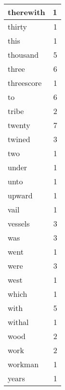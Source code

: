 \begin{center}
\begin{longtable}{l|r}
therewith & 1 \\ \hline
thirty & 1 \\ \hline
this & 1 \\ \hline
thousand & 5 \\ \hline
three & 6 \\ \hline
threescore & 1 \\ \hline
to & 6 \\ \hline
tribe & 2 \\ \hline
twenty & 7 \\ \hline
twined & 3 \\ \hline
two & 1 \\ \hline
under & 1 \\ \hline
unto & 1 \\ \hline
upward & 1 \\ \hline
vail & 1 \\ \hline
vessels & 3 \\ \hline
was & 3 \\ \hline
went & 1 \\ \hline
were & 3 \\ \hline
west & 1 \\ \hline
which & 1 \\ \hline
with & 5 \\ \hline
withal & 1 \\ \hline
wood & 2 \\ \hline
work & 2 \\ \hline
workman & 1 \\ \hline
years & 1 \\ \hline
\end{longtable}
\end{center}



\normalsize



